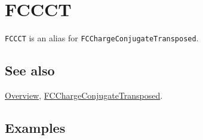 \documentclass[../FeynCalcManual.tex]{subfiles}
\begin{document}
\hypertarget{fccct}{
\section{FCCCT}\label{fccct}}

\texttt{FCCCT} is an alias for \texttt{FCChargeConjugateTransposed}.

\subsection{See also}

\hyperlink{toc}{Overview},
\hyperlink{fcchargeconjugatetransposed}{FCChargeConjugateTransposed}.

\subsection{Examples}
\end{document}
